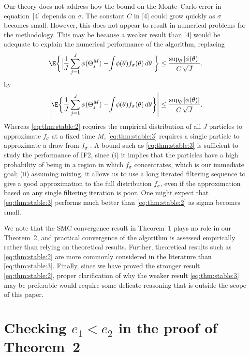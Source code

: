 \documentclass[11pt]{article}
\begin{document}
Our theory does not address how the bound on the Monte~Carlo error in equation~[4] depends on $\sigma$.
The constant $C$ in [4] could grow quickly as $\sigma$ becomes small. 
However, this does not appear to result in numerical problems for the methodology. 
This may be because a weaker result than [4] would be adequate to explain the numerical performance of the algorithm, replacing
\begin{equation} %
\label{eq:thm:stable:2}
\E\bigg\{ \Big| \frac{1}{J}\sum_{j=1}^J\phi(\Theta^M_j) -\! \int \! \phi(\theta)f_\sigma(\theta)\, d\theta \Big| \bigg\}
\le \frac{\sup_\theta|\phi(\theta)|}{C \, \sqrt{J}}.
\end{equation}
by 
\begin{equation} %
\label{eq:thm:stable:3}
\left|\E\bigg\{\frac{1}{J}\sum_{j=1}^J\phi(\Theta^M_j) -\! \int \! \phi(\theta)f_\sigma(\theta)\, d\theta  \bigg\}\right|
\le \frac{\sup_\theta|\phi(\theta)|}{C \, \sqrt{J}}.
\end{equation}
Whereas \eqref{eq:thm:stable:2} requires the empirical distribution of all $J$ particles to approximate $f_\sigma$ at a fixed time $M$, \eqref{eq:thm:stable:3} requires a single particle to approximate a draw from $f_\sigma$
\citep[e.g., equations 3.3.14 and 3.3.15 of][]{delmoral01b}. 
A bound such as \eqref{eq:thm:stable:3} is sufficient to study the performance of IF2, since (i) it implies that the particles have a high probability of being in a region in which $f_\sigma$ concentrates, which is our immediate goal; (ii) assuming mixing, it allows us to use a long iterated filtering sequence to give a good approximation to the full distribution $f_\sigma$, even if the approximation based on any single filtering iteration is poor.
One might expect that \eqref{eq:thm:stable:3} performs much better than \eqref{eq:thm:stable:2} as sigma becomes small.

We note that the SMC convergence result in Theorem~1 plays no role in our Theorem~2, and practical convergence of the algorithm is assessed empirically rather than relying on theoretical results.
Further, theoretical results such as \eqref{eq:thm:stable:2} are more commonly considered in the literature than \eqref{eq:thm:stable:3}.
Finally, since we have proved the stronger result \eqref{eq:thm:stable:2}, proper clarification of why the weaker result \eqref{eq:thm:stable:3} may be preferable would require some delicate reasoning that is outside the scope of this paper.

\section{Checking $e_1<e_2$ in the proof of Theorem~2}
\end{document}
